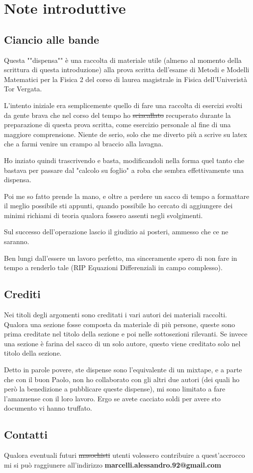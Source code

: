 \chapter{Note introduttive}

\section{Ciancio alle bande}

Questa ""dispensa"" è una raccolta di materiale utile (almeno al momento della scrittura di questa introduzione) alla prova scritta dell'esame  di Metodi e Modelli Matematici per la Fisica 2 del corso di laurea magistrale in Fisica dell'Univeristà Tor Vergata. 

L'intento iniziale era semplicemente quello di fare una raccolta di esercizi svolti da gente brava che nel corso del tempo ho \st{sciacallato} recuperato durante la preparazione di questa prova scritta, come esercizio personale al fine di una maggiore comprensione. Niente de serio, solo che me diverto più a scrive su latex che a farmi venire un crampo al braccio alla lavagna.

Ho inziato quindi trascrivendo e basta, modificandoli nella forma quel tanto che bastava per passare dal "calcolo su foglio" a roba che sembra effettivamente una dispensa. 

Poi me so fatto prende la mano, e oltre a perdere un sacco di tempo a formattare il meglio possibile sti appunti, quando possibile ho cercato di aggiungere dei minimi richiami di teoria qualora fossero assenti negli svolgimenti.

Sul successo dell'operazione lascio il giudizio ai posteri, ammesso che ce ne saranno.


Ben lungi dall'essere un lavoro perfetto, ma sinceramente spero di non fare in tempo a renderlo tale (RIP Equazioni Differenziali in campo complesso).

\section{Crediti}

Nei titoli degli argomenti sono creditati i vari autori dei materiali raccolti. Qualora una sezione fosse composta da materiale di più persone, queste sono prima creditate nel titolo della sezione e poi nelle sottosezioni rilevanti. Se invece una sezione è farina del sacco di un solo autore, questo viene creditato solo nel titolo della sezione.

Detto in parole povere, ste dispense sono l'equivalente di un mixtape, e a parte che con il buon Paolo, non ho collaborato con gli altri due autori (dei quali ho però la benedizione a pubblicare queste dispense), mi sono limitato a fare l'amanuense con il loro lavoro. Ergo se avete cacciato soldi per avere sto documento vi hanno truffato.

\section{Contatti}

Qualora eventuali futuri \st{masochisti} utenti volessero contribuire a quest'accrocco mi si può raggiunere all'indirizzo \textbf{marcelli.alessandro.92@gmail.com}

